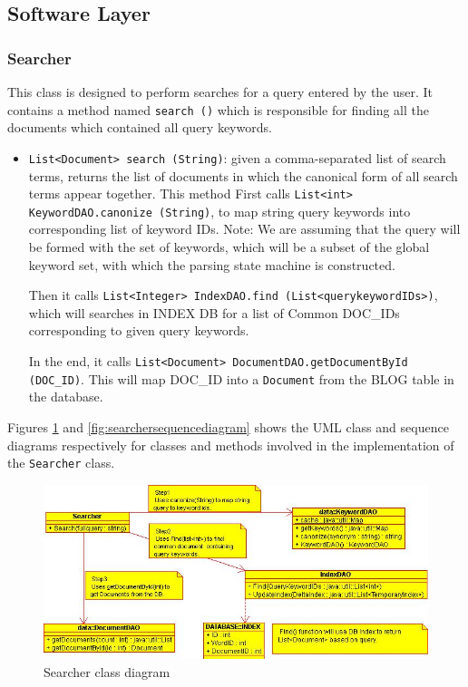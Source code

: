 \documentclass[10pt]{report}
\begin{document}
\subsection{Software Layer}

\subsubsection{Searcher}
This class is designed to perform searches for a query entered by the
user. It contains a method named \texttt{search ()} which is responsible for
finding all the documents which contained all query keywords.

\begin{itemize}
\item \texttt{List<Document> search (String)}: given a comma-separated
  list of search terms, returns the list of documents in which
  the canonical form of all search terms appear together. This method
  First calls \texttt{List<int> KeywordDAO.canonize (String)}, to map
  string query keywords into corresponding list of keyword IDs.  Note:
  We are assuming that the query will be formed with the set of
  keywords, which will be a subset of the global keyword set, with which
  the parsing state machine is constructed.

  Then it calls \texttt{List<Integer> IndexDAO.find (List<querykeywordIDs>)},
  which will searches in INDEX DB for a list of Common DOC\_IDs
  corresponding to given query keywords. 

  In the end, it calls \texttt{List<Document>
    DocumentDAO.getDocumentById (DOC\_ID)}. This will map DOC\_ID into
  a \texttt{Document} from the BLOG table in the database.  
\end{itemize}
 
Figures \ref{fig:searcherclassdiagram} and
\ref{fig:searchersequencediagram} shows the UML class and sequence
diagrams respectively for classes and methods involved in the
implementation of the \texttt{Searcher} class.


\begin{figure}
  \begin{center}
        \includegraphics[width=\textwidth,height=!]{searcherclassdiagram}
  \end{center}
  \caption{Searcher class diagram}
  \label{fig:searcherclassdiagram}
\end{figure} 
\end{document}

